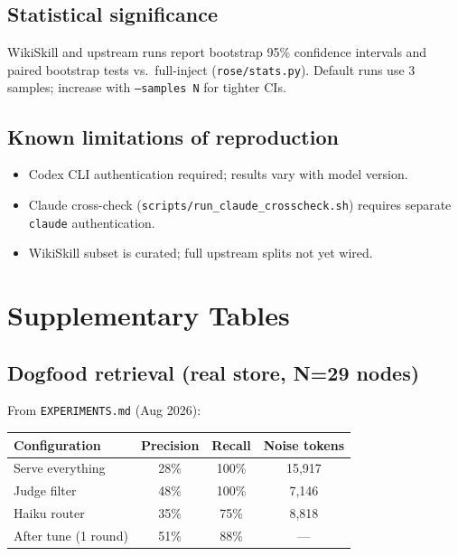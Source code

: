 \subsection{Statistical significance}

WikiSkill and upstream runs report bootstrap 95\% confidence intervals and paired bootstrap tests vs.\ full-inject (\texttt{rose/stats.py}).
Default runs use 3 samples; increase with \texttt{--samples N} for tighter CIs.

\subsection{Known limitations of reproduction}

\begin{itemize}
  \item Codex CLI authentication required; results vary with model version.
  \item Claude cross-check (\texttt{scripts/run\_claude\_crosscheck.sh}) requires separate \texttt{claude} authentication.
  \item WikiSkill subset is curated; full upstream splits not yet wired.
\end{itemize}

\section{Supplementary Tables}

\subsection{Dogfood retrieval (real store, N=29 nodes)}

From \texttt{EXPERIMENTS.md} (Aug 2026):

\begin{table}[h]
  \centering
  \begin{tabular}{lccc}
    \toprule
    Configuration & Precision & Recall & Noise tokens \\
    \midrule
    Serve everything & 28\% & 100\% & 15,917 \\
    Judge filter & 48\% & 100\% & 7,146 \\
    Haiku router & 35\% & 75\% & 8,818 \\
    After tune (1 round) & 51\% & 88\% & --- \\
    \bottomrule
  \end{tabular}
\end{table}

